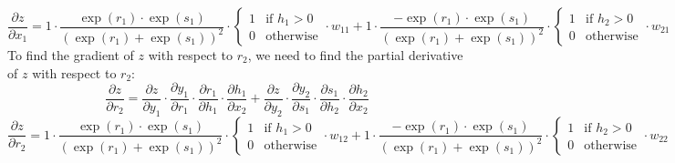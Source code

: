 \documentclass[a3paper,12pt]{extarticle} %
\begin{document}
\begin{enumerate}
\begin{enumerate}
\[\]
\[
\frac{\partial z}{\partial x_1} = 1 \cdot \frac{\exp(r_1) \cdot \exp(s_1)}{(\exp(r_1) + \exp(s_1))^2} \cdot \begin{cases} 1 & \text{if } h_1 > 0 \\ 0 & \text{otherwise} \end{cases} \cdot w_{11} + 1 \cdot \frac{-\exp(r_1) \cdot \exp(s_1)}{(\exp(r_1) + \exp(s_1))^2} \cdot \begin{cases} 1 & \text{if } h_2 > 0 \\ 0 & \text{otherwise} \end{cases} \cdot w_{21}
\]
To find the gradient of $z$ with respect to $r_2$, we need to find the partial derivative of $z$ with respect to $r_2$:
\[
\frac{\partial z}{\partial r_2} = \frac{\partial z}{\partial y_1} \cdot \frac{\partial y_1}{\partial r_1} \cdot \frac{\partial r_1}{\partial h_1} \cdot \frac{\partial h_1}{\partial x_2} + \frac{\partial z}{\partial y_2} \cdot \frac{\partial y_2}{\partial s_1} \cdot \frac{\partial s_1}{\partial h_2} \cdot \frac{\partial h_2}{\partial x_2}
\]
\[
\frac{\partial z}{\partial r_2} = 1 \cdot \frac{\exp(r_1) \cdot \exp(s_1)}{(\exp(r_1) + \exp(s_1))^2} \cdot \begin{cases} 1 & \text{if } h_1 > 0 \\ 0 & \text{otherwise} \end{cases} \cdot w_{12} + 1 \cdot \frac{-\exp(r_1) \cdot \exp(s_1)}{(\exp(r_1) + \exp(s_1))^2} \cdot \begin{cases} 1 & \text{if } h_2 > 0 \\ 0 & \text{otherwise} \end{cases} \cdot w_{22}
\]



\end{enumerate}
\end{enumerate}
\end{document}
